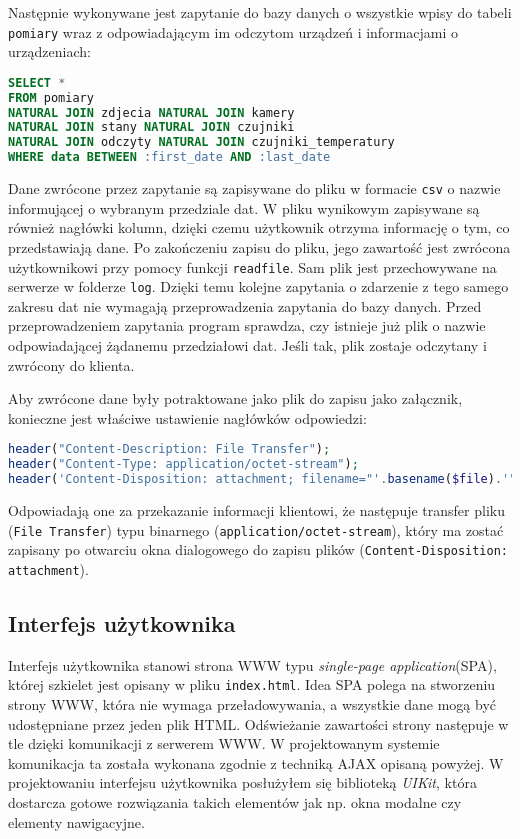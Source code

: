 \documentclass[a4paper,11pt,twoside]{article}
\begin{document}
Następnie wykonywane jest zapytanie do bazy danych o wszystkie wpisy do tabeli \texttt{pomiary} wraz z odpowiadającym im odczytom urządzeń i informacjami o urządzeniach:
\begin{lstlisting}[language=SQL]
SELECT *
FROM pomiary 
NATURAL JOIN zdjecia NATURAL JOIN kamery
NATURAL JOIN stany NATURAL JOIN czujniki
NATURAL JOIN odczyty NATURAL JOIN czujniki_temperatury
WHERE data BETWEEN :first_date AND :last_date
\end{lstlisting}
Dane zwrócone przez zapytanie są zapisywane do pliku w formacie \texttt{csv} o nazwie informującej o wybranym przedziale dat. W pliku wynikowym zapisywane są również nagłówki kolumn, dzięki czemu użytkownik otrzyma informację o tym, co przedstawiają dane. Po zakończeniu zapisu do pliku, jego zawartość jest zwrócona użytkownikowi przy pomocy funkcji \texttt{readfile}. Sam plik jest przechowywane na serwerze w folderze \texttt{log}. Dzięki temu kolejne zapytania o zdarzenie z tego samego zakresu dat nie wymagają przeprowadzenia zapytania do bazy danych. Przed przeprowadzeniem zapytania program sprawdza, czy istnieje już plik o nazwie odpowiadającej żądanemu przedziałowi dat. Jeśli tak, plik zostaje odczytany i zwrócony do klienta.

Aby zwrócone dane były potraktowane jako plik do zapisu jako załącznik, konieczne jest właściwe ustawienie nagłówków odpowiedzi:
\begin{lstlisting}[language=PHP]
header("Content-Description: File Transfer");
header("Content-Type: application/octet-stream");
header('Content-Disposition: attachment; filename="'.basename($file).'"');
\end{lstlisting}
Odpowiadają one za przekazanie informacji klientowi, że następuje transfer pliku (\texttt{File Transfer}) typu binarnego (\texttt{application/octet-stream}), który ma zostać zapisany po otwarciu okna dialogowego do zapisu plików (\texttt{Content-Disposition: attachment}).\cite{content-disposition}\cite{mime2}

\subsection{Interfejs użytkownika}
Interfejs użytkownika stanowi strona WWW typu \textit{single-page application}(SPA), której szkielet jest opisany w pliku \texttt{index.html}. Idea SPA polega na stworzeniu strony WWW, która nie wymaga przeładowywania, a wszystkie dane mogą być udostępniane przez jeden plik HTML. Odświeżanie zawartości strony następuje w tle dzięki komunikacji z serwerem WWW. W projektowanym systemie komunikacja ta została wykonana zgodnie z techniką AJAX opisaną powyżej. W projektowaniu interfejsu użytkownika posłużyłem się biblioteką \textit{UIKit}, która dostarcza gotowe rozwiązania takich elementów jak np. okna modalne czy elementy nawigacyjne.
\end{document}
